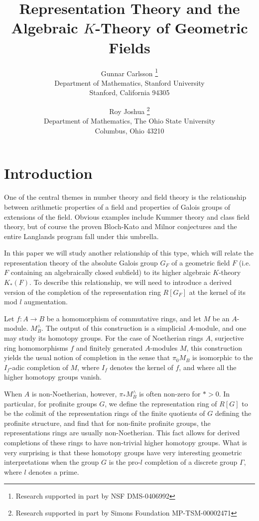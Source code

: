\documentclass[11pt]{article}
\title{Representation Theory and the Algebraic $K$-Theory of Geometric Fields}
\author{Gunnar Carlsson \footnote{Research supported in part by NSF DMS-0406992}  \\ Department of Mathematics, Stanford University  \\Stanford, California 94305 \and 
Roy Joshua \footnote{Research supported in part by Simons Foundation MP-TSM-00002471}\\ Department of Mathematics, The Ohio State University \\ Columbus, Ohio 43210}
\begin{document}
\maketitle
\tableofcontents

\section{Introduction}
One of the central themes in number theory and field theory is the relationship between arithmetic properties of a field and properties of Galois groups of extensions of the field.  Obvious examples include Kummer theory and class field theory, but of course the proven  Bloch-Kato and Milnor conjectures  and the entire Langlands program fall under this umbrella.        

In this paper we will  study another relationship of this type, which will relate the representation theory of the absolute Galois group $G_F$ of a geometric field $F$ (i.e. $F$ containing an algebraically closed subfield) to its higher algebraic $K$-theory $K_*(F)$.  To describe this relationship, we will need to introduce a derived version of the completion of the representation ring $R[G_F]$ at the kernel of its mod $l$ augmentation. 

Let $f:A \rightarrow B$ be a homomorphism of commutative rings, and let $M$ be an $A$-module. 
$M^{\wedge}_B$.  The output of this construction is a simplicial $A$-module, and one may study its homotopy groups.  For the case of Noetherian rings $A$, surjective ring homomorphisms $f$ and finitely generated $A$-modules $M$, this construction yields the usual notion of  completion in the sense that $\pi _0M_B$ is isomorphic to the $I_f$-adic completion of $M$, where $I_f$ denotes the kernel of $f$, and where all the higher homotopy groups vanish. 

 When $A$ is non-Noetherian, however, $\pi _* M^{\wedge}_B$ is often  non-zero for $*>0$. In  particular, for profinite groups $G$, we define the representation ring of $R[G]$ to be the colimit of the representation rings of the finite quotients of $G$ defining the profinite structure, and find that for non-finite profinite groups, the representations rings are usually non-Noetherian. This fact allows for derived completions of these rings to have non-trivial higher homotopy groups.  What is very surprising is that these  homotopy groups have very interesting geometric interpretations when the group $G$ is the pro-$l$ completion of a discrete group $\Gamma$, where $l$ denotes a prime. 
 
\end{document}

